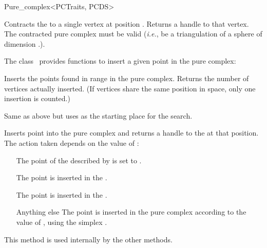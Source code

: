 \begin{ccRefClass}{Pure_complex<PCTraits, PCDS>}
\begin{ccAdvanced}

{Contracts the  to a single vertex at position . Returns a
handle to that vertex. \ccPrecond The contracted pure complex must be valid
(\emph{i.e.}, be a triangulation of a sphere of dimension
\ccVar.).}

\end{ccAdvanced}



The class \ccRefName\ provides functions to insert a given point in the
pure complex:

%
{Inserts the points found in range \ccc{[s,e)} in the pure complex. Returns
the number of vertices actually inserted. (If  vertices share the
same position in space, only one insertion is counted.)}


%
{Same as above but uses  as the starting place for the search.}

\begin{ccAdvanced}

 {Inserts
point  into the pure complex and returns a handle to the
 at that position. The action taken depends on the value of
:\begin{itemize} \item[\ccc{ON_VERTEX}] The point of the
 described by  is set to . \item[\ccc{IN_FACE}]
The point  is inserted in the . \item[\ccc{IN_FACET}]
The point  is inserted in the . \item[Anything else]
The point  is inserted in the pure complex according to the value
of , using the simplex .\end{itemize} This method is used
internally by the other  methods.}


\end{ccAdvanced}
\end{ccRefClass}
